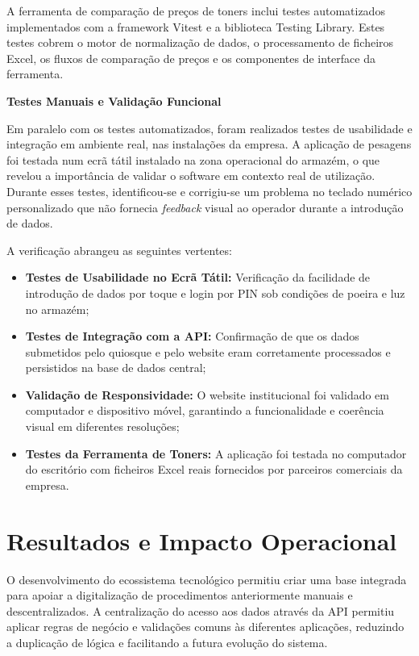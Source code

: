 A ferramenta de comparação de preços de toners inclui testes automatizados implementados com a framework Vitest e a biblioteca Testing Library. Estes testes cobrem o motor de normalização de dados, o processamento de ficheiros Excel, os fluxos de comparação de preços e os componentes de interface da ferramenta.

\noindent\textbf{Testes Manuais e Validação Funcional}

Em paralelo com os testes automatizados, foram realizados testes de usabilidade e integração em ambiente real, nas instalações da empresa. A aplicação de pesagens foi testada num ecrã tátil instalado na zona operacional do armazém, o que revelou a importância de validar o software em contexto real de utilização. Durante esses testes, identificou-se e corrigiu-se um problema no teclado numérico personalizado que não fornecia \textit{feedback} visual ao operador durante a introdução de dados.

A verificação abrangeu as seguintes vertentes:
\begin{itemize}
    \item \textbf{Testes de Usabilidade no Ecrã Tátil:} Verificação da facilidade de introdução de dados por toque e login por PIN sob condições de poeira e luz no armazém;
    \item \textbf{Testes de Integração com a API:} Confirmação de que os dados submetidos pelo quiosque e pelo website eram corretamente processados e persistidos na base de dados central;
    \item \textbf{Validação de Responsividade:} O website institucional foi validado em computador e dispositivo móvel, garantindo a funcionalidade e coerência visual em diferentes resoluções;
    \item \textbf{Testes da Ferramenta de Toners:} A aplicação foi testada no computador do escritório com ficheiros Excel reais fornecidos por parceiros comerciais da empresa.
\end{itemize}

\section{Resultados e Impacto Operacional}\label{sec:resultados}

O desenvolvimento do ecossistema tecnológico permitiu criar uma base integrada para apoiar a digitalização de procedimentos anteriormente manuais e descentralizados. A centralização do acesso aos dados através da \ac{API} permitiu aplicar regras de negócio e validações comuns às diferentes aplicações, reduzindo a duplicação de lógica e facilitando a futura evolução do sistema.

